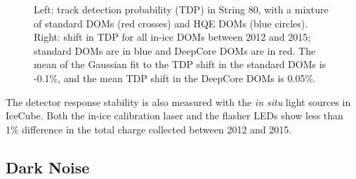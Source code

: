 \begin{figure}[!h]
  \captionsetup[subfigure]{labelformat=empty}
  \centering
  \caption{Left: track detection probability (TDP) in String 80, with a
    mixture of standard DOMs (red crosses) and HQE DOMs (blue
    circles). Right: shift in TDP for all in-ice DOMs between 2012 and 2015; standard DOMs are in blue and
    DeepCore DOMs are in red. The mean of the Gaussian fit to
    the TDP shift in the standard DOMs is -0.1\%, and the mean 
    TDP shift in the DeepCore DOMs is 0.05\%.}
  \label{fig:tdp}
\end{figure}

The detector response stability is also measured with the {\it in
  situ} light sources in IceCube. Both the in-ice calibration laser
\cite{IC3:SC} and the flasher LEDs show less than 1\% difference in the total
charge collected between 2012 and 2015. 

\subsection{\label{sect:darknoise}Dark Noise}

